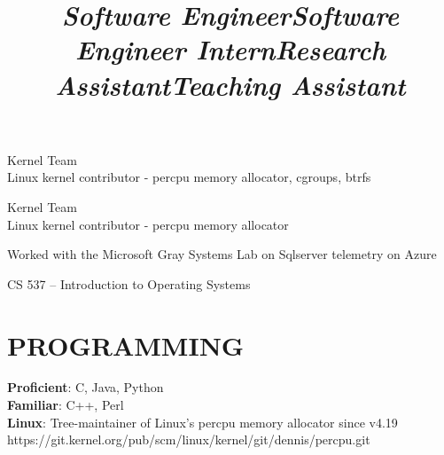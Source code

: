 \documentclass[margin,11pt]{res}
\begin{document}
\begin{resume}
\title{\sl{Software Engineer}}
\begin{position}
Kernel Team\\
Linux kernel contributor - percpu memory allocator, cgroups, btrfs
\end{position}

\vspace{-24pt}
\employer{}
\location{}
\title{\sl{Software Engineer Intern}}
\begin{position}
Kernel Team\\
Linux kernel contributor - percpu memory allocator
\end{position}

\title{\sl{Research Assistant}}
\begin{position}
Worked with the Microsoft Gray Systems Lab on Sqlserver telemetry on Azure
\end{position}

\vspace{-24pt}
\employer{}
\location{}
\title{\sl{Teaching Assistant}}
\begin{position}
CS 537 – Introduction to Operating Systems
\end{position}


\section{PROGRAMMING}

\textbf{Proficient}: C, Java, Python\\
\textbf{Familiar}: C++, Perl\\
\textbf{Linux}: Tree-maintainer of Linux's percpu memory allocator since v4.19\\
https://git.kernel.org/pub/scm/linux/kernel/git/dennis/percpu.git


\end{resume}
\end{document}
